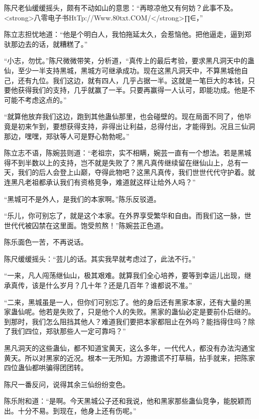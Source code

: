
\begin{this_body}

陈尺老仙缓缓摇头，颇有不动如山的意思：“再晾凉他又有何妨？此事不及。<strong>八零电子书HtTp://Www.80txt.COM/</strong>∏∈，”

陈立志担忧地道：“他是个明白人，我怕拖延太久，会惹恼他。把他逼走，逼到郑驮那边去的话，就糟糕了。”

“小志，勿忧。”陈尺微微带笑，分析道，“真传上的最后考验，要求黑凡洞天中的蛊仙，至少一半支持黑城，黑城方可继承成功。现在这黑凡洞天中，不算黑城他自己，还有九位。我们这边，就有四人，几乎占据一半。这就是一笔巨大的本钱，只要他获得我们的支持，几乎就赢了一半。只要再赢得一人认可，即能功成。他是不可能不考虑这点的。”

“就算他放弃我们这边，跑到其他蛊仙那里，也会碰壁的。现在局面不同了，他毕竟是初来乍到，要想获得支持，非得出让利益，总得付出，才能得到。况且三仙洞那边，嘿嘿，郑驮等人可是野心勃勃呢。”

陈立志不语，陈婉芸则道：“老祖宗，实不相瞒，婉芸一直有一个想法。若是黑城得不到半数以上的支持，岂不就是失败了？黑凡真传继续留在继仙山上，总有一天，我们的后人会登上山巅，夺得此物吧？这黑凡真传，我们世世代代守护着。就连黑凡老祖都承认我们有资格竞争，难道就这样让给外人吗？”

“黑城可不是外人，是我们的本家啊。”陈乐反驳道。

“乐儿，你可别忘了，就是这个本家。在外界享受繁华和自由。而我们这一脉，世世代代被囚禁在这里面。饱受煎熬！”陈婉芸正色道。

陈乐面色一苦，不再说话。

陈尺缓缓摇头：“芸儿的话。其实我早就考虑过了，此法不行。”

“一来，凡人闯荡继仙山，极其艰难。就算我们全心培养，要等到幸运儿出现，继承真传，该是什么岁月？几十年？还是几百年？谁都说不准。”

“二来，黑城虽是一人，但你们可别忘了。他的身后还有黑家本家，还有大量的黑家蛊仙呢。他若是失败了，只是他个人的失败。黑家的蛊仙必定是要前仆后继的。到那时，我们怎么阻挡其他人？难道我们要把本家都阻止在外吗？能挡得住吗？除了我们四位，郑驮那些人一定可靠吗？”

黑凡洞天的这些蛊仙，都不知道宝黄天，这么多年，一代代人，都没有办法沟通宝黄天。所以对黑家的近况。根本一无所知。方源撒谎不打草稿，拈手就来，把陈家四位蛊仙都哄骗得团团转。

陈尺一番反问，说得其余三仙纷纷变色。

陈乐附和道：“是啊。今天黑城公子还和我说，他和黑家那些蛊仙竞争，能脱颖而出。十分不易。到现在，他身上还有伤呢。”


\end{this_body}

